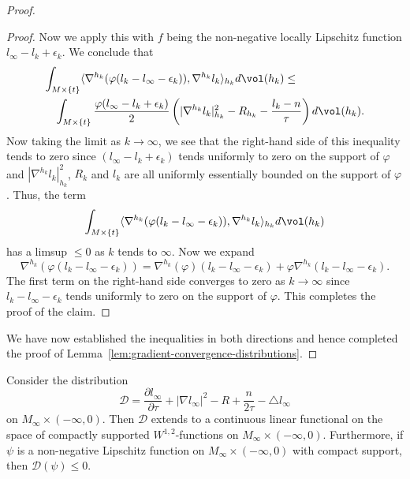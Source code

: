 \begin{proof}
\begin{proof}
Now we apply this with $f$ being the non-negative locally Lipschitz
function $l_\infty-l_k+\epsilon_k$. We conclude that
\begin{eqnarray*}
\lefteqn{\int_{M\times\{t\}}\langle \nabla^{h_k}(\varphi(
l_k-l_\infty-\epsilon_k)),\nabla^{h_k} l_k\rangle_{h_k}d\vol(h_k) \le}  \\
& & \int_{M\times\{t\}}\frac{\varphi(l_\infty-
l_k+\epsilon_k)}{2}\left(|\nabla^{h_k}
l_k|_{h_k}^2-R_{h_k}-\frac{l_k-n}{\tau}\right)d\vol(h_k).
\end{eqnarray*}
Now taking the limit as $k\rightarrow\infty$, we see that the
right-hand side of this inequality tends to zero since $(l_\infty-
l_k+\epsilon_k)$ tends uniformly to zero on the support of $\varphi$
and $|\nabla^{h_k}l_k|_{h_k}^2$, $R_k$ and $l_k$ are all uniformly
essentially bounded on the support of $\varphi$. Thus, the term
$$\int_{M\times\{t\}}\langle\nabla^{h_k}(\varphi(
l_k-l_\infty-\epsilon_k)),\nabla^{h_k} l_k\rangle_{h_k}d\vol(h_k)$$ has a limsup $\le 0$ as $k$ tends to $\infty$. Now we
expand
$$\nabla^{h_k}(\varphi(l_k-l_\infty-\epsilon_k))=\nabla^{h_k}(\varphi)(l_k-l_\infty-\epsilon_k)+
\varphi\nabla^{h_k}(l_k-l_\infty-\epsilon_k).$$ The first term on
the right-hand side converges to zero as $k\rightarrow\infty$ since
$l_k-l_\infty-\epsilon_k$ tends uniformly to zero on the support of
$\varphi$. This completes the proof of the claim.
\end{proof}
We have now established the  inequalities in both directions and
hence completed the proof of Lemma~\ref{lem:gradient-convergence-distributions}.
\end{proof}




\begin{lemma}\label{lem:distribution-d-nonpositive}
Consider the distribution
$${\mathcal D}=\frac{\partial
l_\infty}{\partial \tau}+|\nabla
l_\infty|^2-R+\frac{n}{2\tau}-\triangle l_\infty$$ on
$M_\infty\times (-\infty,0)$. Then ${\mathcal D}$ extends to a
continuous linear functional on the space of compactly supported
$W^{1,2}$-functions on $M_\infty\times (-\infty,0)$. Furthermore, if
$\psi$ is a non-negative Lipschitz function on $M_\infty\times
(-\infty,0)$ with compact support, then ${\mathcal D}(\psi)\le 0$.
\end{lemma}

